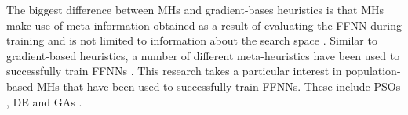 The biggest difference between \acp{MH} and gradient-bases heuristics is that
\acp{MH} make use of meta-information obtained as a result of evaluating the \acs{FFNN} during training and is not limited to information about the search space \cite{ref:blum:2003}. Similar to gradient-based heuristics, a number of different meta-heuristics have been used to successfully train \acp{FFNN} \cite{ref:rakitianskaia:2012, ref:vanwyk:2014, ref:espinal:2011, ref:gupta:1999}. This research takes a particular interest in population-based \acp{MH} that have been used to successfully train \acp{FFNN}. These include \acp{PSO} \cite{ref:shi:1998}, \acf{DE} \cite{ref:price:2006} and \Acp{GA} \cite{ref:fraser:1957}.